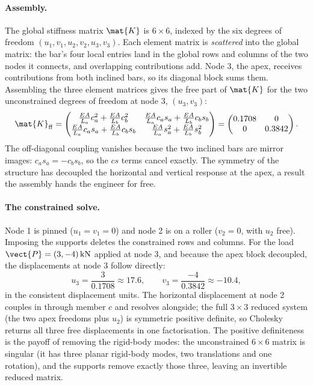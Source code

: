 \paragraph{Assembly.}
The global stiffness matrix $\mat{K}$ is $6 \times 6$, indexed by the
six degrees of freedom $(u_{1}, v_{1}, u_{2}, v_{2}, u_{3}, v_{3})$.
Each element matrix is \emph{scattered} into the global matrix: the
bar's four local entries land in the global rows and columns of the
two nodes it connects, and overlapping contributions add. Node 3, the
apex, receives contributions from both inclined bars, so its diagonal
block sums them. Assembling the three element matrices gives the free
part of $\mat{K}$ for the two unconstrained degrees of freedom at node
3, $(u_{3}, v_{3})$:
\[
\mat{K}_{\mathrm{ff}} = \begin{pmatrix}
\tfrac{EA}{L_{a}}c_{a}^{2} + \tfrac{EA}{L_{b}}c_{b}^{2} & \tfrac{EA}{L_{a}}c_{a}s_{a} + \tfrac{EA}{L_{b}}c_{b}s_{b} \\[2pt]
\tfrac{EA}{L_{a}}c_{a}s_{a} + \tfrac{EA}{L_{b}}c_{b}s_{b} & \tfrac{EA}{L_{a}}s_{a}^{2} + \tfrac{EA}{L_{b}}s_{b}^{2}
\end{pmatrix}
= \begin{pmatrix} 0.1708 & 0 \\ 0 & 0.3842 \end{pmatrix}.
\]
The off-diagonal coupling vanishes because the two inclined bars are
mirror images: $c_{a}s_{a} = -c_{b}s_{b}$, so the $cs$ terms cancel
exactly. The symmetry of the structure has decoupled the horizontal
and vertical response at the apex, a result the assembly hands the
engineer for free.

\paragraph{The constrained solve.}
Node 1 is pinned ($u_{1} = v_{1} = 0$) and node 2 is on a roller
($v_{2} = 0$, with $u_{2}$ free). Imposing the supports deletes the
constrained rows and columns. For the load $\vect{P} = (3, -4)\,
\text{kN}$ applied at node 3, and because the apex block decoupled,
the displacements at node 3 follow directly:
\[
u_{3} = \frac{3}{0.1708} \approx 17.6, \qquad
v_{3} = \frac{-4}{0.3842} \approx -10.4,
\]
in the consistent displacement units. The horizontal displacement at
node 2 couples in through member $c$ and resolves alongside; the full
$3 \times 3$ reduced system (the two apex freedoms plus $u_{2}$) is
symmetric positive definite, so Cholesky returns all three free
displacements in one factorisation. The positive definiteness is the
payoff of removing the rigid-body modes: the unconstrained $6 \times
6$ matrix is singular (it has three planar rigid-body modes, two
translations and one rotation), and the supports remove exactly those
three, leaving an invertible reduced matrix.

